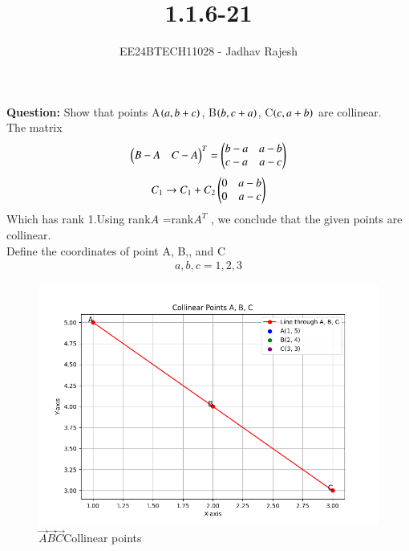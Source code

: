 \documentclass[journal]{IEEEtran}
\begin{document}

\vspace{3cm}
\title{1.1.6-21}
\author{EE24BTECH11028 - Jadhav Rajesh}
{\let\newpage\relax\maketitle}

\renewcommand{\thefigure}{\theenumi}
\renewcommand{\thetable}{\theenumi}
\setlength{\intextsep}{10pt} %


\renewcommand{\thetable}{\theenumi}
 \textbf{Question:} Show that points A$\left(a,b+c\right)$, B$\left(b,c+a\right)$, C$\left(c,a+b\right)$ are collinear.\\

 \solution The matrix\\
 \begin{align}
                \begin{pmatrix}B-A & C-A\end{pmatrix}^{T} =
                                 \begin{pmatrix}b-a & a-b\\
                                        c-a & a-c\end{pmatrix}
 \end{align}
 \begin{align}
                 C_{1}\rightarrow{C_{1}+C_{2}} \begin{pmatrix}0 & a-b\\
                                                     0 & a-c\end{pmatrix}
 \end{align}
            Which has rank 1.Using rank$A$ =rank$A^{T}$ , we conclude that the given points are collinear.\\

            Define the coordinates of point A, B,, and C
 \begin{align}
             a,b,c = 1,2,3
 \end{align}

\begin{figure}[h!]
	\centering
	\includegraphics[width=0.5\linewidth]{Figs/Figure_1.png}
	\caption{ $\vec{A}\vec{B}\vec{C}$Collinear points}


	\label{stemplot}
\end{figure}
              

          

    
            
            
        




            
\end{document}
